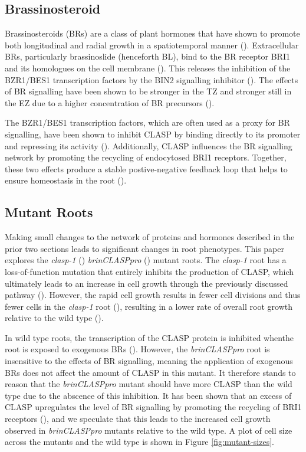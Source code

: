 \subsection{Brassinosteroid}

Brassinosteroids (BRs) are a class of plant hormones that have shown to promote both longitudinal and radial growth in a spatiotemporal manner (\cite{ackerman-lavert2020}). Extracellular BRs, particularly brassinoslide (henceforth BL), bind to the BR receptor BRI1 and its homologues on the cell membrane (\cite{vukasinovic2021}). This releases the inhibition of the BZR1/BES1 transcription factors by the BIN2 signalling inhibitor (\cite{ackerman-lavert2020}). The effects of BR signalling have been shown to be stronger in the TZ and stronger still in the EZ due to a higher concentration of BR precursors (\cite{vukasinovic2021}). 

\medskip

The BZR1/BES1 transcription factors, which are often used as a proxy for BR signalling, have been shown to inhibit CLASP by binding directly to its promoter and repressing its activity (\cite{ruan2018}). Additionally, CLASP influences the BR signalling network by promoting the recycling of endocytosed BRI1 receptors. Together, these two effects produce a stable postive-negative feedback loop that helps to ensure homeostasis in the root (\cite{ruan2018}).

\subsection{Mutant Roots}

Making small changes to the network of proteins and hormones described in the prior two sections leads to significant changes in root phenotypes. This paper explores the \emph{clasp-1} (\cite{ambrose2007}) \emph{brinCLASPpro} (\cite{ruan2018}) mutant roots. The \emph{clasp-1} root has a loss-of-function mutation that entirely inhibits the production of CLASP, which ultimately leads to an increase in cell growth through the previously discussed pathway (\cite{halat2022}). However, the rapid cell growth results in fewer cell divisions and thus fewer cells in the \emph{clasp-1} root (\cite{halat2022}), resulting in a lower rate of overall root growth relative to the wild type (\cite{ambrose2007}). 


\medskip

In wild type roots, the transcription of the CLASP protein is inhibited whenthe root is exposed to exogenous BRs (\cite{ruan2018}). However, the \emph{brinCLASPpro} root is insensitive to the effects of BR signalling, meaning the application of exogenous BRs does not affect the amount of CLASP in this mutant. It therefore stands to reason that the \emph{brinCLASPpro} mutant should have more CLASP than the wild type due to the abscence of this inhibition. It has been shown that an excess of CLASP upregulates the level of BR signalling by promoting the recycling of BRI1 receptors (\cite{ruan2018}), and we speculate that this leads to the increased cell growth observed in \emph{brinCLASPpro} mutants relative to the wild type. A plot of cell size across the mutants and the wild type is shown in Figure \ref{fig:mutant-sizes}.

